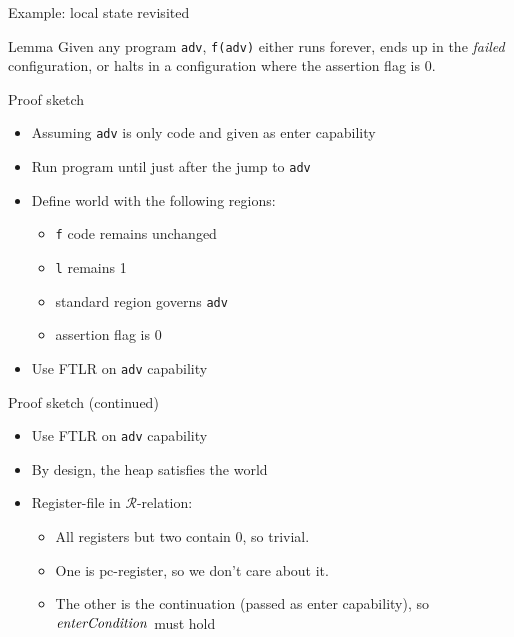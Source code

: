 \documentclass{beamer}
\newcommand{\pcreg}{\mathrm{pc}}
\newcommand{\failed}{\textsl{failed}}
\newcommand{\plainfun}[2]{
  \ifthenelse{\equal{#2}{}}
             {\mathit{#1}}
             {\mathit{#1}(#2)}
}
\newcommand{\entryCond}[1]{\plainfun{enterCondition}{#1}}
\newcommand{\asmType}{\plaindom{AsmType}}
\newcommand{\plaindom}[1]{\mathrm{#1}}
\newcommand{\intr}[2]{\mathcal{#1}}
\newcommand{\regintr}[1]{\intr{R}{#1}}
\newcommand{\stdrr}{\regintr{\asmType}}
\begin{document}
\begin{frame}{Example: local state revisited}
\begin{overprint}
\begin{block}{Lemma}
  Given any program \texttt{adv}, \texttt{f(adv)} either runs forever, ends up in the \failed{} configuration, or halts in a configuration where the assertion flag is 0.
\end{block}

Proof sketch
\begin{itemize}
\item<2-> Assuming \texttt{adv} is only code and given as enter capability
\item<3-> Run program until just after the jump to \texttt{adv}
\item<4-> Define world with the following regions:
  \begin{itemize}
  \item<5-> \texttt{f} code remains unchanged
  \item<6-> \texttt{l} remains 1
  \item<7-> standard region governs \texttt{adv}
  \item<8-> assertion flag is 0
  \end{itemize}
\item<9-> Use FTLR on \texttt{adv} capability 
\end{itemize}

Proof sketch (continued)
\begin{itemize}
\item<10-> Use FTLR on \texttt{adv} capability
\item<11-> By design, the heap satisfies the world
\item<12-> Register-file in $\stdrr$-relation:
  \begin{itemize}
  \item<13-> All registers but two contain 0, so trivial.
  \item<14-> One is $\pcreg$-register, so we don't care about it.
  \item<15-> The other is the continuation (passed as enter capability), so $\entryCond{}$ must hold
  \end{itemize}
\end{itemize}


\end{overprint}
\end{frame}
\end{document}
